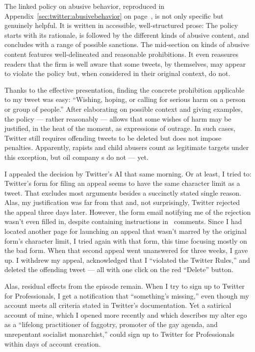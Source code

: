 \noindent{}The linked policy on abusive behavior, reproduced in
Appendix~\ref{sec:twitter:abusivebehavior} on
page~\pageref{sec:twitter:abusivebehavior}, is not only specific but genuinely
helpful. It is written in accessible, well-structured prose: The policy starts
with its rationale, is followed by the different kinds of abusive content, and
concludes with a range of possible sanctions. The mid-section on kinds of
abusive content features well-delineated and reasonable prohibitions. It even
reassures readers that the firm is well aware that some tweets, by themselves,
may appear to violate the policy but, when considered in their original context,
do not.

Thanks to the effective presentation, finding the concrete prohibition
applicable to my tweet was easy: ``Wishing, hoping, or calling for serious harm
on a person or group of people.'' After elaborating on possible context and
giving examples, the policy --- rather reasonably --- allows that some wishes of
harm may be justified, in the heat of the moment, as expressions of outrage. In
such cases, Twitter still requires offending tweets to be deleted but does not
impose penalties. Apparently, rapists and child abusers count as legitimate
targets under this exception, but oil company \CEO{}s do not --- yet.

I appealed the decision by Twitter's AI that same morning. Or at least, I tried
to: Twitter's form for filing an appeal seems to have the same character limit
as a tweet. That excludes most arguments besides a succinctly stated single
reason. Alas, my justification was far from that and, not surprisingly, Twitter
rejected the appeal three days later. However, the form email notifying me of
the rejection wasn't even filled in, despite containing instructions in \HTML\
comments. Since I had located another page for launching an appeal that wasn't
marred by the original form's character limit, I tried again with that form,
this time focusing mostly on the bad form. When that second appeal went
unanswered for three weeks, I gave up. I withdrew my appeal, acknowledged that I
``violated the Twitter Rules,'' and deleted the offending tweet --- all with one
click on the red ``Delete'' button.

Alas, residual effects from the episode remain. When I try to sign up to Twitter
for Professionals, I get a notification that ``something's missing,'' even
though my account meets all criteria stated in Twitter's documentation. Yet a
satirical account of mine, which I opened more recently and which describes my
alter ego as a ``lifelong practitioner of faggotry, promoter of the gay agenda,
and unrepentant socialist monarchist,'' could sign up to Twitter for
Professionals within days of account creation.


